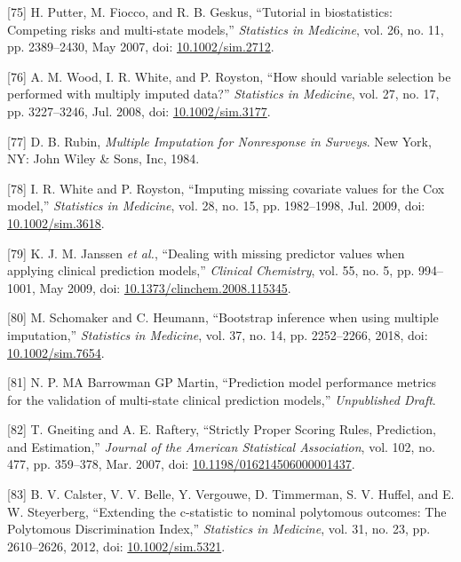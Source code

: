 \documentclass[
]{article}
\newenvironment{cslreferences}%
  {}%
  {\par}
\begin{document}
\begin{cslreferences}
\leavevmode\hypertarget{ref-putter_tutorial_2007}{}%
{[}75{]} H. Putter, M. Fiocco, and R. B. Geskus, ``Tutorial in biostatistics: Competing risks and multi-state models,'' \emph{Statistics in Medicine}, vol. 26, no. 11, pp. 2389--2430, May 2007, doi: \href{https://doi.org/10.1002/sim.2712}{10.1002/sim.2712}.

\leavevmode\hypertarget{ref-wood_how_2008}{}%
{[}76{]} A. M. Wood, I. R. White, and P. Royston, ``How should variable selection be performed with multiply imputed data?'' \emph{Statistics in Medicine}, vol. 27, no. 17, pp. 3227--3246, Jul. 2008, doi: \href{https://doi.org/10.1002/sim.3177}{10.1002/sim.3177}.

\leavevmode\hypertarget{ref-rubin_multiple_1984}{}%
{[}77{]} D. B. Rubin, \emph{Multiple Imputation for Nonresponse in Surveys}. New York, NY: John Wiley \& Sons, Inc, 1984.

\leavevmode\hypertarget{ref-white_imputing_2009}{}%
{[}78{]} I. R. White and P. Royston, ``Imputing missing covariate values for the Cox model,'' \emph{Statistics in Medicine}, vol. 28, no. 15, pp. 1982--1998, Jul. 2009, doi: \href{https://doi.org/10.1002/sim.3618}{10.1002/sim.3618}.

\leavevmode\hypertarget{ref-janssen_dealing_2009}{}%
{[}79{]} K. J. M. Janssen \emph{et al.}, ``Dealing with missing predictor values when applying clinical prediction models,'' \emph{Clinical Chemistry}, vol. 55, no. 5, pp. 994--1001, May 2009, doi: \href{https://doi.org/10.1373/clinchem.2008.115345}{10.1373/clinchem.2008.115345}.

\leavevmode\hypertarget{ref-schomaker_bootstrap_2018}{}%
{[}80{]} M. Schomaker and C. Heumann, ``Bootstrap inference when using multiple imputation,'' \emph{Statistics in Medicine}, vol. 37, no. 14, pp. 2252--2266, 2018, doi: \href{https://doi.org/10.1002/sim.7654}{10.1002/sim.7654}.

\leavevmode\hypertarget{ref-chap-performance-metrics}{}%
{[}81{]} N. P. MA Barrowman GP Martin, ``Prediction model performance metrics for the validation of multi-state clinical prediction models,'' \emph{Unpublished Draft}.

\leavevmode\hypertarget{ref-gneiting_strictly_2007}{}%
{[}82{]} T. Gneiting and A. E. Raftery, ``Strictly Proper Scoring Rules, Prediction, and Estimation,'' \emph{Journal of the American Statistical Association}, vol. 102, no. 477, pp. 359--378, Mar. 2007, doi: \href{https://doi.org/10.1198/016214506000001437}{10.1198/016214506000001437}.

\leavevmode\hypertarget{ref-calster_extending_2012-1}{}%
{[}83{]} B. V. Calster, V. V. Belle, Y. Vergouwe, D. Timmerman, S. V. Huffel, and E. W. Steyerberg, ``Extending the c-statistic to nominal polytomous outcomes: The Polytomous Discrimination Index,'' \emph{Statistics in Medicine}, vol. 31, no. 23, pp. 2610--2626, 2012, doi: \href{https://doi.org/10.1002/sim.5321}{10.1002/sim.5321}.


\end{cslreferences}
\end{document}
